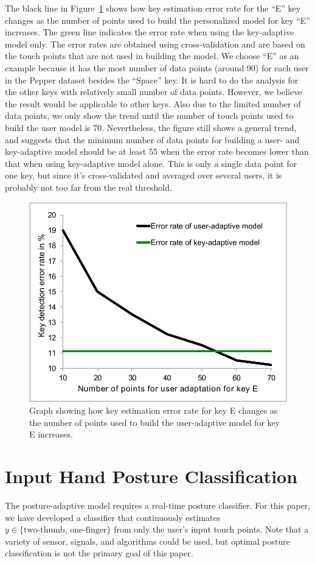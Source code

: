 \documentclass{sigchi}
\begin{document}
The black line in Figure~\ref{fig:user-adapt} shows how key estimation error rate for the ``E'' key
changes as the number of points used to build
the personalized model for key ``E'' increases. The green line indicates the
error rate when using the key-adaptive model only. The error rates are obtained using cross-validation and are based on the touch points that are not used in building the
model. We choose ``E'' as an
example because it has the most number of data points (around 90) for each
user in the Pepper dataset besides the ``Space'' key. It is hard to do the
analysis for the other keys with relatively small number of data points. However, we believe the result would be applicable to other
keys. Also due to the limited number
of data points, we only show the trend until the number of touch points used to build the user
model is 70. Nevertheless, the figure still shows a general trend, and suggests 
that the minimum number of data points for building a user- and key-adaptive model
should be at least 55 when the error rate becomes lower than that when using key-adaptive model alone. This is only a single data point for one key, but since it's cross-validated and averaged over several users, it is probably not too far from the real threshold.

\begin{figure}[tb]
  \centering
  \includegraphics[width=0.9\columnwidth]{figures/chart1.pdf}
  \caption{Graph showing how key estimation error rate for key E changes as the number of
  points used to build the user-adaptive model for key E increases.}
  \label{fig:user-adapt}
\end{figure}

\section{Input Hand Posture Classification}\label{sec:posture-classification}
The posture-adaptive model requires a real-time posture classifier.  For this paper, we have developed a classifier that continuously estimates $y \in \{\text{two-thumb, one-finger}\}$ from only the user's input touch points.  Note that a variety of sensor, signals, and algorithms could be used, but optimal posture classification is not the primary goal of this paper.
\end{document}
